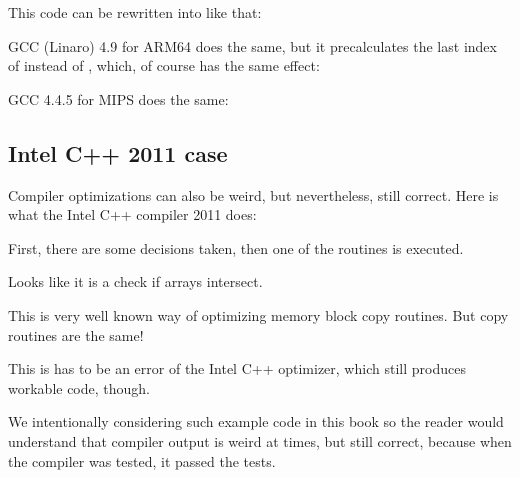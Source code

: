 This code can be rewritten into \CCpp like that:



GCC (Linaro) 4.9 for ARM64 does the same, but it precalculates the last index of  
instead of , which, of course has the same effect:




GCC 4.4.5 for MIPS does the same:



\subsection{Intel C++ 2011 case}
\myindex{\CompilerAnomaly}
\label{loops_iterators_loop_anomaly}

Compiler optimizations can also be weird, but nevertheless, still correct.
Here is what the Intel C++ compiler 2011 does:



First, there are some decisions taken, then one of the routines is executed.

Looks like it is a check if arrays intersect.

This is very well known way of optimizing memory block copy routines.
But copy routines are the same!

This is has to be an error of the Intel C++ optimizer, which still produces workable code, though.

We intentionally considering such example code in this book so the reader would understand that compiler output is weird at times,
but still correct, because when the compiler was tested, it passed the tests.
